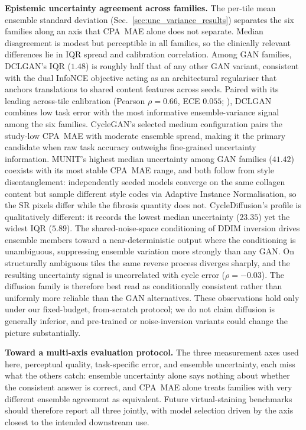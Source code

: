 \noindent\textbf{Epistemic uncertainty agreement across families.}
The per-tile mean ensemble standard deviation (Sec.~\ref{sec:unc_variance_results}) separates
the six families along an axis that CPA~MAE alone does not separate.
Median disagreement is modest but perceptible in all families, so the clinically relevant
differences lie in IQR spread and calibration correlation.
Among GAN families, DCLGAN's IQR ($1.48$) is roughly half that of any other GAN
variant, consistent with the dual InfoNCE objective acting as an architectural
regulariser that anchors translations to shared content features across seeds.
Paired with its leading across-tile calibration (Pearson $\rho = 0.66$, ECE $0.055$;
), DCLGAN combines low task error with the most informative
ensemble-variance signal among the six families.
CycleGAN's selected medium configuration pairs the study-low CPA~MAE with moderate
ensemble spread, making it the primary candidate when raw task accuracy outweighs
fine-grained uncertainty information.
MUNIT's highest median uncertainty among GAN families ($41.42$) coexists with its most
stable CPA~MAE range, and both follow from style disentanglement: independently seeded
models converge on the same collagen content but sample different style codes via
Adaptive Instance Normalisation, so the SR pixels differ while the fibrosis quantity
does not.
CycleDiffusion's profile is qualitatively different: it records the lowest median
uncertainty ($23.35$) yet the widest IQR ($5.89$).
The shared-noise-space conditioning of DDIM inversion drives ensemble members toward
a near-deterministic output where the conditioning is unambiguous, suppressing
ensemble variation more strongly than any GAN.
On structurally ambiguous tiles the same reverse process diverges sharply, and the
resulting uncertainty signal is uncorrelated with cycle error ($\rho = {-}0.03$).
The diffusion family is therefore best read as conditionally consistent rather than
uniformly more reliable than the GAN alternatives.
These observations hold only under our fixed-budget, from-scratch protocol; we do not
claim diffusion is generally inferior, and pre-trained or noise-inversion variants could
change the picture substantially.

\noindent\textbf{Toward a multi-axis evaluation protocol.}
The three measurement axes used here, perceptual quality, task-specific error, and
ensemble uncertainty, each miss what the others catch: ensemble uncertainty alone says
nothing about whether the consistent answer is correct, and CPA~MAE alone treats
families with very different ensemble agreement as equivalent.
Future virtual-staining benchmarks should therefore report all three jointly, with model
selection driven by the axis closest to the intended downstream use.

